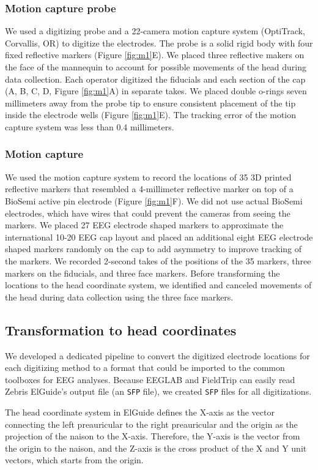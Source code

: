 \documentclass{UCF_ETD}
\renewcommand{\ul}{}
\begin{document}
\subsubsection{Motion capture probe}
We used a digitizing probe and a 22-camera motion capture system (OptiTrack, Corvallis, OR) to digitize the electrodes. The probe is a solid rigid body with four fixed reflective markers (Figure \ref{fig:m1}E). We placed three reflective makers on the face of the mannequin to account for possible movements of the head during data collection. Each operator digitized the fiducials and each section of the cap (A, B, C, D, Figure \ref{fig:m1}A) in separate takes. We placed double o-rings seven millimeters away from the probe tip to ensure consistent placement of the tip inside the electrode wells (Figure \ref{fig:m1}E). The tracking error of the motion capture system was less than 0.4 millimeters. 

\subsubsection{Motion capture}
We used the motion capture system to record the locations of 35 3D printed reflective markers that resembled a 4-millimeter reflective marker on top of a BioSemi active pin electrode (Figure \ref{fig:m1}F). We did not use actual BioSemi electrodes, which have wires that could prevent the cameras from seeing the markers. We placed 27 EEG electrode shaped markers to approximate the international 10-20 EEG cap layout and placed an additional eight EEG electrode shaped markers randomly \ul{on} the cap to add asymmetry to improve tracking of the markers. We recorded 2-second takes of the positions of the 35 markers, three markers on the fiducials, and three face markers. Before transforming the locations to the head coordinate system, we identified and canceled movements of the head during data collection using the three face markers.

\subsection{Transformation to head coordinates}
We developed a dedicated pipeline to convert the digitized electrode locations for each digitizing method to a format that could be imported to the common toolboxes for EEG analyses. Because EEGLAB and FieldTrip can easily read Zebris ElGuide's output file (an {\tt SFP} file), we created {\tt SFP} files for all digitizations.

The head coordinate system in ElGuide defines the X-axis as the vector connecting the left preauricular to the right preauricular and the origin as the projection of the naison to the X-axis. Therefore, the Y-axis is the vector from the origin to the naison, and the Z-axis is the cross product of the X and Y unit vectors, which starts from the origin.
\end{document}

